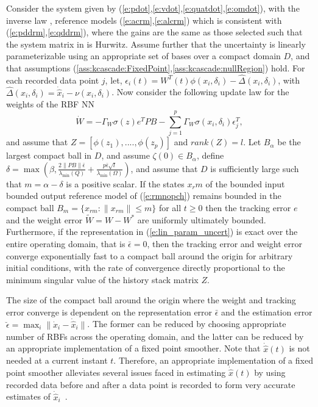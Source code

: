 \begin{theorem}\label{thm:conc_NN_AMIAC}
    Consider the system
    given by (\ref{e:pdot},\ref{e:vdot},\ref{e:quatdot},\ref{e:omdot}), with the inverse law , reference models (\ref{e:acrm},\ref{e:alcrm}) which is consistent with (\ref{e:pddrm},\ref{e:qddrm}),  where the gains are the same as those selected such that the system matrix in
     is Hurwitz. Assume further that the uncertainty is linearly parameterizable using an appropriate set of bases over a compact domain $D$, and that assumptions (\ref{ass:kcascade:FixedPoint},\ref{ass:kcascade:nullRegion}) hold. For each recorded data point $j$, let, $\epsilon_i(t)=W^T(t)\phi(x_i,\delta_i)-\hat\Delta(x_i,\delta_i)$, with $\hat\Delta(x_i,\delta_i)=\dot{\hat x}_i-\nu(x_i,\delta_i)$. Now consider the following update law for the weights of the RBF NN
      \begin{equation}
        \label{eq:Wdot_adapt_I_NN_AMIAC}
        \dot{W}=-\Gamma_W\sigma(z)e^TPB - \sum\limits_{j = 1}^p \Gamma_W\sigma(x_i,\delta_i)\epsilon^T_{j},
    \end{equation}
    and assume that $Z=[\phi(z_1),....,\phi(z_p)]$ and $rank(Z)=l$. Let $B_\alpha$ be the largest compact ball in $D$, and assume $\zeta(0)\in B_\alpha$, define $\delta=\max(\beta,\frac{2\|PB\|\bar{\epsilon}}{\lambda_{\min}(Q)}+\frac{p\bar{\epsilon}\sqrt{l}}{\lambda_{\min}(\Omega)})$, and assume that $D$ is sufficiently large such that $m=\alpha-\delta$ is a positive scalar. If the states $x_rm$ of the bounded input bounded output reference model of (\ref{e:rmnopch}) remains bounded in the compact ball $B_m=\{x_{rm}:\|x_{rm}\|\leq m\}$ for all $t\geq0$ then the tracking error $e$ and the weight error $\tilde W=W-W^*$  are uniformly ultimately bounded. Furthermore, if the representation in (\ref{e:lin_param_uncert}) is exact over the entire operating domain, that is $\bar \epsilon=0$, then the tracking error and weight error converge exponentially fast to a compact ball around the origin for arbitrary initial conditions, with the rate of convergence directly proportional to the minimum singular value of the history stack matrix $Z$.
\end{theorem}
\begin{remark}
    The size of the compact ball around the origin where the weight and tracking error converge is dependent on the representation error $\bar\epsilon$ and the estimation error $\breve\epsilon=\max_i\|\dot x_i-\dot{\hat{x}}_i\|$. The former can be reduced by choosing appropriate number of RBFs across the operating domain, and the latter can be reduced by an appropriate implementation of a fixed point smoother. Note that $\dot{\hat{x}}(t)$ is not needed at a current instant $t$. Therefore, an appropriate implementation of a fixed point smoother alleviates several issues faced in estimating $\dot{\hat{x}}(t)$ by using recorded data before and after a data point is recorded to form very accurate estimates of $\dot{\hat{x}}_i$~\cite{Gelb:74bk,Chowdhary:JGCD:10}.
\end{remark}
